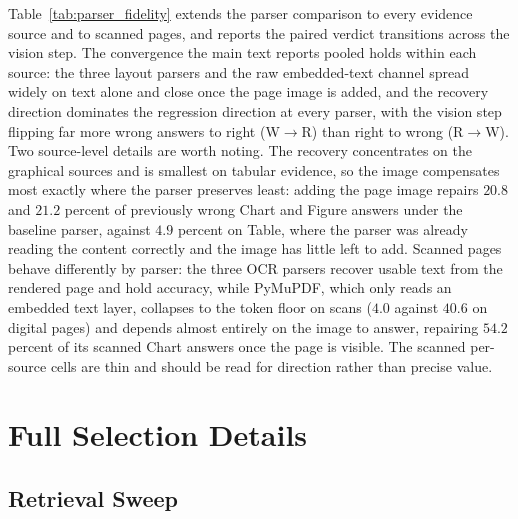 Table~\ref{tab:parser_fidelity} extends the parser comparison to every evidence source and to scanned pages, and reports the paired verdict transitions across the vision step. The convergence the main text reports pooled holds within each source: the three layout parsers and the raw embedded-text channel spread widely on text alone and close once the page image is added, and the recovery direction dominates the regression direction at every parser, with the vision step flipping far more wrong answers to right (W$\rightarrow$R) than right to wrong (R$\rightarrow$W). Two source-level details are worth noting. The recovery concentrates on the graphical sources and is smallest on tabular evidence, so the image compensates most exactly where the parser preserves least: adding the page image repairs $20.8$ and $21.2$ percent of previously wrong Chart and Figure answers under the baseline parser, against $4.9$ percent on Table, where the parser was already reading the content correctly and the image has little left to add. Scanned pages behave differently by parser: the three OCR parsers recover usable text from the rendered page and hold accuracy, while PyMuPDF, which only reads an embedded text layer, collapses to the token floor on scans ($4.0$ against $40.6$ on digital pages) and depends almost entirely on the image to answer, repairing $54.2$ percent of its scanned Chart answers once the page is visible. The scanned per-source cells are thin and should be read for direction rather than precise value.






\section{Full Selection Details}
\label{app:add_selection}

\subsection{Retrieval Sweep}
\label{app:retrieval_sweep}

